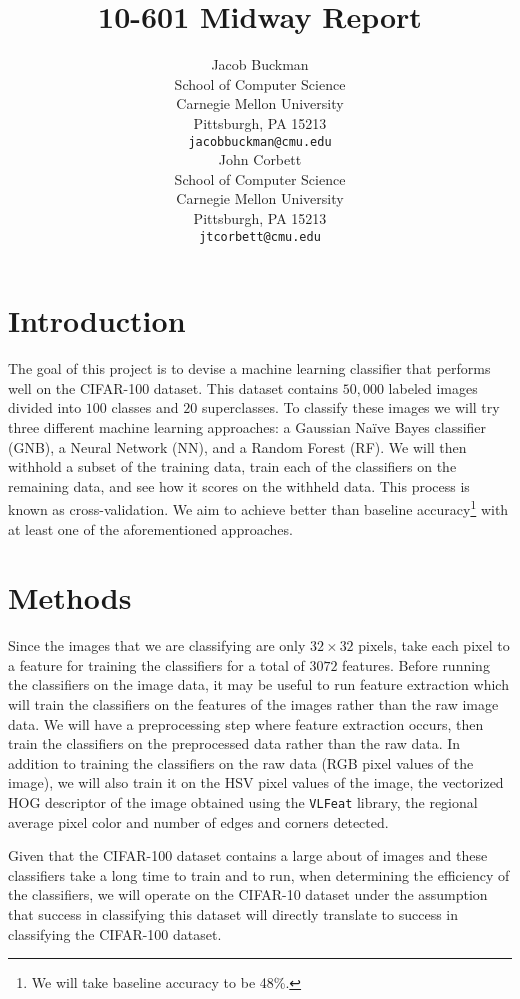 \documentclass{article} %
\title{10-601 Midway Report}
\author{
Jacob Buckman \\
School of Computer Science\\
Carnegie Mellon University\\
Pittsburgh, PA 15213 \\
\texttt{jacobbuckman@cmu.edu} \\
\And
John Corbett \\
School of Computer Science \\
Carnegie Mellon University \\
Pittsburgh, PA 15213 \\
\texttt{jtcorbett@cmu.edu} \\
}
\begin{document}
\maketitle

\section{Introduction}

The goal of this project is to devise a machine learning classifier that performs well on the CIFAR-100 dataset. This dataset contains $50,000$ labeled images divided into $100$ classes and $20$ superclasses. To classify these images we will try three different machine learning approaches: a Gaussian Na\"ive Bayes classifier (GNB), a Neural Network (NN), and a Random Forest (RF). We will then withhold a subset of the training data, train each of the classifiers on the remaining data, and see how it scores on the withheld data. This process is known as cross-validation. We aim to achieve better than baseline accuracy\footnote{We will take baseline accuracy to be 48\%.} with at least one of the aforementioned approaches.

\section{Methods}

Since the images that we are classifying are only $32 \times 32$ pixels, take each pixel to a feature for training the classifiers for a total of $3072$ features. Before running the classifiers on the image data, it may be useful to run feature extraction which will train the classifiers on the features of the images rather than the raw image data. We will have a preprocessing step where feature extraction occurs, then train the classifiers on the preprocessed data rather than the raw data. In addition to training the classifiers on the raw data (RGB pixel values of the image), we will also train it on the HSV pixel values of the image, the vectorized HOG descriptor of the image obtained using the \verb|VLFeat| library, the regional average pixel color and number of edges and corners detected.

Given that the CIFAR-100 dataset contains a large about of images and these classifiers take a long time to train and to run, when determining the efficiency of the classifiers, we will operate on the CIFAR-10 dataset under the assumption that success in classifying this dataset will directly translate to success in classifying the CIFAR-100 dataset.
\end{document}
